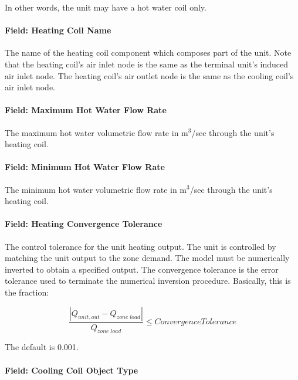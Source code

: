 In other words, the unit may have a hot water coil only.

\paragraph{Field: Heating Coil Name}\label{field-heating-coil-name-1}

The name of the heating coil component which composes part of the unit. Note that the heating coil's air inlet node is the same as the terminal unit's induced air inlet node. The heating coil's air outlet node is the same as the cooling coil's air inlet node.

\paragraph{Field: Maximum Hot Water Flow Rate}\label{field-maximum-hot-water-flow-rate}

The maximum hot water volumetric flow rate in m\(^{3}\)/sec through the unit's heating coil.

\paragraph{Field: Minimum Hot Water Flow Rate}\label{field-minimum-hot-water-flow-rate}

The minimum hot water volumetric flow rate in m\(^{3}\)/sec through the unit's heating coil.

\paragraph{Field: Heating Convergence Tolerance}\label{field-heating-convergence-tolerance}

The control tolerance for the unit heating output. The unit is controlled by matching the unit output to the zone demand. The model must be numerically inverted to obtain a specified output. The convergence tolerance is the error tolerance used to terminate the numerical inversion procedure. Basically, this is the fraction:

\begin{equation}
\frac{{\left| {{Q_{unit,out}} - {Q_{zone\;load}}} \right|}}{{{Q_{zone\;load}}}} \le ConvergenceTolerance
\end{equation}

The default is 0.001.

\paragraph{Field: Cooling Coil Object Type}\label{field-cooling-coil-object-type}


